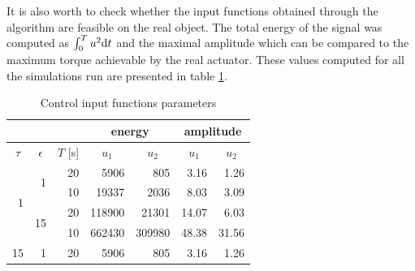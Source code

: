 It is also worth to check whether the input functions obtained through the algorithm are feasible on the real object. The total energy of the signal was computed as $\int_0^T u^2\mathrm{d} t$ and the maximal amplitude which can be compared to the maximum torque achievable by the real actuator. These values computed for all the simulations run are presented in table \ref{tab:control}.
\begin{table}[h]
\centering
\caption{Control input functions parameters}
\label{tab:control}
\begin{tabular}{rrr|r|r|r|r|}
\cline{4-7}
\multicolumn{1}{c}{}                      & \multicolumn{1}{c}{}                     & \multicolumn{1}{c|}{}            & \multicolumn{2}{c|}{energy}                             & \multicolumn{2}{c|}{amplitude}                          \\ \hline
\multicolumn{1}{|c|}{$\tau$}              & \multicolumn{1}{c|}{$\epsilon$}          & \multicolumn{1}{c|}{$T$ {[}s{]}} & \multicolumn{1}{c|}{$u_1$} & \multicolumn{1}{c|}{$u_2$} & \multicolumn{1}{c|}{$u_1$} & \multicolumn{1}{c|}{$u_2$} \\ \hline
\multicolumn{1}{|r|}{\multirow{4}{*}{1}}  & \multicolumn{1}{r|}{\multirow{2}{*}{1}}  & 20                               & 5906                       & 805                        & 3.16                       & 1.26                       \\ \cline{3-7} 
\multicolumn{1}{|r|}{}                    & \multicolumn{1}{r|}{}                    & 10                               & 19337                      & 2036                       & 8.03                       & 3.09                       \\ \cline{2-7} 
\multicolumn{1}{|r|}{}                    & \multicolumn{1}{r|}{\multirow{2}{*}{15}} & 20                               & 118900                     & 21301                      & 14.07                      & 6.03                       \\ \cline{3-7} 
\multicolumn{1}{|r|}{}                    & \multicolumn{1}{r|}{}                    & 10                               & 662430                     & 309980                     & 48.38                      & 31.56                      \\ \hline
\multicolumn{1}{|r|}{\multirow{4}{*}{15}} & \multicolumn{1}{r|}{\multirow{2}{*}{1}}  & 20                               & 5906                       & 805                        & 3.16                       & 1.26                       \\ \cline{3-7} 

\end{tabular}
\end{table}
